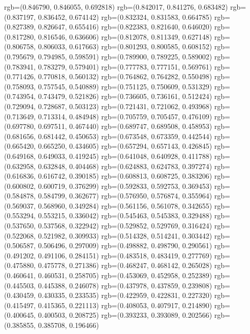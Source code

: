 {{{					rgb=(0.846790, 0.846055, 0.692818)
					rgb=(0.842017, 0.841276, 0.683482)
					rgb=(0.837197, 0.836452, 0.674142)
					rgb=(0.832324, 0.831583, 0.664785)
					rgb=(0.827389, 0.826647, 0.655416)
					rgb=(0.822383, 0.821640, 0.646020)
					rgb=(0.817280, 0.816546, 0.636606)
					rgb=(0.812078, 0.811349, 0.627148)
					rgb=(0.806758, 0.806033, 0.617663)
					rgb=(0.801293, 0.800585, 0.608152)
					rgb=(0.795679, 0.794985, 0.598591)
					rgb=(0.789900, 0.789225, 0.589002)
					rgb=(0.783941, 0.783279, 0.579401)
					rgb=(0.777783, 0.777151, 0.569761)
					rgb=(0.771426, 0.770818, 0.560132)
					rgb=(0.764862, 0.764282, 0.550498)
					rgb=(0.758093, 0.757545, 0.540889)
					rgb=(0.751125, 0.750609, 0.531329)
					rgb=(0.743954, 0.743479, 0.521826)
					rgb=(0.736605, 0.736161, 0.512424)
					rgb=(0.729094, 0.728687, 0.503123)
					rgb=(0.721431, 0.721062, 0.493968)
					rgb=(0.713649, 0.713314, 0.484948)
					rgb=(0.705759, 0.705457, 0.476109)
					rgb=(0.697780, 0.697511, 0.467440)
					rgb=(0.689747, 0.689508, 0.458953)
					rgb=(0.681656, 0.681442, 0.450653)
					rgb=(0.673548, 0.673359, 0.442544)
					rgb=(0.665420, 0.665250, 0.434605)
					rgb=(0.657294, 0.657143, 0.426845)
					rgb=(0.649168, 0.649033, 0.419245)
					rgb=(0.641048, 0.640928, 0.411788)
					rgb=(0.632958, 0.632848, 0.404468)
					rgb=(0.624883, 0.624783, 0.397274)
					rgb=(0.616836, 0.616742, 0.390185)
					rgb=(0.608813, 0.608725, 0.383206)
					rgb=(0.600802, 0.600719, 0.376299)
					rgb=(0.592833, 0.592753, 0.369453)
					rgb=(0.584878, 0.584799, 0.362677)
					rgb=(0.576950, 0.576874, 0.355964)
					rgb=(0.569037, 0.568960, 0.349284)
					rgb=(0.561156, 0.561078, 0.342655)
					rgb=(0.553294, 0.553215, 0.336042)
					rgb=(0.545463, 0.545383, 0.329488)
					rgb=(0.537650, 0.537568, 0.322942)
					rgb=(0.529852, 0.529769, 0.316424)
					rgb=(0.522068, 0.521982, 0.309933)
					rgb=(0.514328, 0.514241, 0.303442)
					rgb=(0.506587, 0.506496, 0.297009)
					rgb=(0.498882, 0.498790, 0.290561)
					rgb=(0.491202, 0.491106, 0.284151)
					rgb=(0.483518, 0.483419, 0.277769)
					rgb=(0.475880, 0.475778, 0.271386)
					rgb=(0.468247, 0.468142, 0.265028)
					rgb=(0.460641, 0.460531, 0.258705)
					rgb=(0.453069, 0.452958, 0.252389)
					rgb=(0.445503, 0.445388, 0.246078)
					rgb=(0.437978, 0.437859, 0.239808)
					rgb=(0.430459, 0.430335, 0.233535)
					rgb=(0.422959, 0.422831, 0.227320)
					rgb=(0.415497, 0.415365, 0.221113)
					rgb=(0.408053, 0.407917, 0.214890)
					rgb=(0.400645, 0.400503, 0.208725)
					rgb=(0.393233, 0.393089, 0.202566)
					rgb=(0.385855, 0.385708, 0.196466)
}}}
